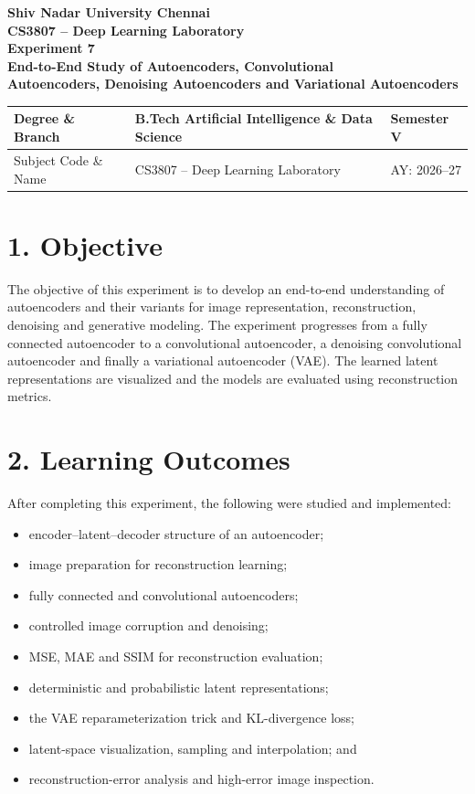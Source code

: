 \documentclass[10pt]{article}
\begin{document}
\begin{center}
{\large\textbf{Shiv Nadar University Chennai}}\\[2mm]
{\normalsize\textbf{CS3807 -- Deep Learning Laboratory}}\\[2mm]
{\large\textbf{Experiment 7}}\\[1mm]
{\normalsize\textbf{End-to-End Study of Autoencoders, Convolutional}}\\
{\normalsize\textbf{Autoencoders, Denoising Autoencoders and Variational Autoencoders}}
\end{center}

\vspace{3mm}
\begin{tabular}{|p{3.4cm}|p{9.0cm}|p{1.4cm}|}
\hline
Degree \& Branch & B.Tech Artificial Intelligence \& Data Science & Semester V\\
\hline
Subject Code \& Name & CS3807 -- Deep Learning Laboratory & AY: 2026--27\\
\hline
\end{tabular}

\section*{1. Objective}
The objective of this experiment is to develop an end-to-end understanding of autoencoders and their variants for image representation, reconstruction, denoising and generative modeling. The experiment progresses from a fully connected autoencoder to a convolutional autoencoder, a denoising convolutional autoencoder and finally a variational autoencoder (VAE). The learned latent representations are visualized and the models are evaluated using reconstruction metrics.

\section*{2. Learning Outcomes}
After completing this experiment, the following were studied and implemented:
\begin{itemize}
\item encoder--latent--decoder structure of an autoencoder;
\item image preparation for reconstruction learning;
\item fully connected and convolutional autoencoders;
\item controlled image corruption and denoising;
\item MSE, MAE and SSIM for reconstruction evaluation;
\item deterministic and probabilistic latent representations;
\item the VAE reparameterization trick and KL-divergence loss;
\item latent-space visualization, sampling and interpolation; and
\item reconstruction-error analysis and high-error image inspection.
\end{itemize}
\end{document}
